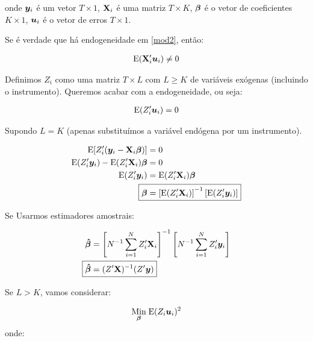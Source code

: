 \documentclass[11pt, oneside, a4paper, article]{article}
\numberwithin{equation}{section}
\begin{document}
\begin{description}
\noindent
onde 
$\boldsymbol{y}_{i}$ é um vetor $T \times 1$,
$\mathbf{X}_{i}$ é uma matriz $T \times K$,
$\boldsymbol{\beta}$ é o vetor de coeficientes $K \times 1$,
$\boldsymbol{u}_{i}$ é o vetor de erros $T \times 1$.

Se é verdade que há endogeneidade em \eqref{mod2}, então:

\vspace{-1 em}
\begin{align*}
	\text{E}(\mathbf{X}_{i}^{\prime} \boldsymbol{u}_{i}) \neq 0
\end{align*}

Definimos $Z_{i}$ como uma matriz $T \times L$ com $L \geq K$ de variáveis exógenas (incluindo o instrumento).
Queremos acabar com a endogeneidade, ou seja:

\vspace{-1 em}
\begin{align*}
	\text{E}(Z_{i}^{\prime} \boldsymbol{u}_{i}) = 0
\end{align*}

Supondo $L = K$ (apenas substituímos a variável endógena por um instrumento).

\vspace{-1 em}
\begin{align*}
\E[ Z_{i}^{\prime} ( \yvec_{i} - \Xmat_{i} \betavec ) ] &= 0
\\
\E( Z_{i}^{\prime} \yvec_{i} ) - \E( Z_{i}^{\prime} \Xmat_{i} ) \betavec &= 0
\\
\E( Z_{i}^{\prime} \yvec_{i} ) &= \E( Z_{i}^{\prime} \Xmat_{i} ) \betavec
\\
\Aboxed{
\betavec &=
\left[ \E( Z_{i}^{\prime} \Xmat_{i} ) \right]^{-1}
\left[ \E( Z_{i}^{\prime} \yvec_{i} ) \right]
}
\end{align*}

Se Usarmos estimadores amostrais:

\vspace{-1 em}
\begin{align*}
\mbs{\hat{\beta}} &=
\left[ N^{-1} \sum_{i=1}^{N} Z_{i}^{\prime} \Xmat_{i} \right]^{-1}
\left[ N^{-1} \sum_{i=1}^{N} Z_{i}^{\prime} \yvec_{i} \right]
\\
\Aboxed{
\mbs{\hat{\beta}} &=
( Z^{\prime} \Xmat )^{-1} ( Z^{\prime} \yvec ) }
\end{align*}

\vspace{1 em}
Se $L > K$, vamos considerar:

\vspace{-1 em}
\begin{align*}
\underset{\boldsymbol{\beta}}{\text{Min}} \;
\text{E}( Z_{i}\boldsymbol{u}_{i} )^2
\end{align*}
\noindent onde:


\end{description}
\end{document}
